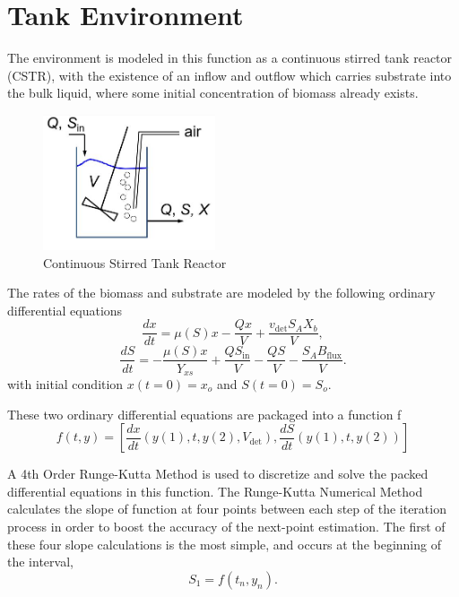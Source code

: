 \documentclass[letterpaper, twoside]{article}
\numberwithin{equation}{section}
\begin{document}
  \section{Tank Environment}
The environment is modeled in this function as a continuous stirred tank reactor (CSTR), with the existence of an inflow and outflow which carries substrate into the bulk liquid, where some initial concentration of biomass already exists.

\begin{figure}[H]
\centering
\includegraphics[width=2in]{CSTR_model.jpg}
\caption{Continuous Stirred Tank Reactor}
\end{figure}

The rates of the biomass and substrate are modeled by the following ordinary differential equations
\begin{equation} \label{eq: BiomassEquation}
  \frac{dx}{dt} = \mu(S) x - \frac{Q x}{V} + \frac{ v_{\mathrm{det}} S_A X_b}{V},
\end{equation}
\begin{equation} \label{eq: SubstrateEquation}
  \frac{dS}{dt} = -\frac{\mu(S) x}{Y_{xs}} + \frac{Q S_{\mathrm{in}}}{V} - \frac{Q S}{V} - \frac{S_A B_{\mathrm{flux}}}{V}.
\end{equation}
with initial condition $x(t=0)=x_o$ and $S(t=0)=S_o$.

These two ordinary differential equations are packaged into a function f
\begin{equation} \label{eq: ODEpackagef}
  f(t,y) = \left[\frac{dx}{dt}\left(y(1), t, y(2), V_\mathrm{det}\right) , 
	      \frac{dS}{dt}\left(y(1), t, y(2)\right)\right]
\end{equation}

A 4th Order Runge-Kutta Method is used to discretize and solve the packed differential equations in this function. The Runge-Kutta Numerical Method calculates the slope of function at four points between each step of the iteration process in order to boost the accuracy of the next-point estimation. The first of these four slope calculations is the most simple, and occurs at the beginning of the interval,
\begin{equation} \label{eq: S_1}
  S_1 = f(t_n,y_n).
\end{equation}
\end{document}
